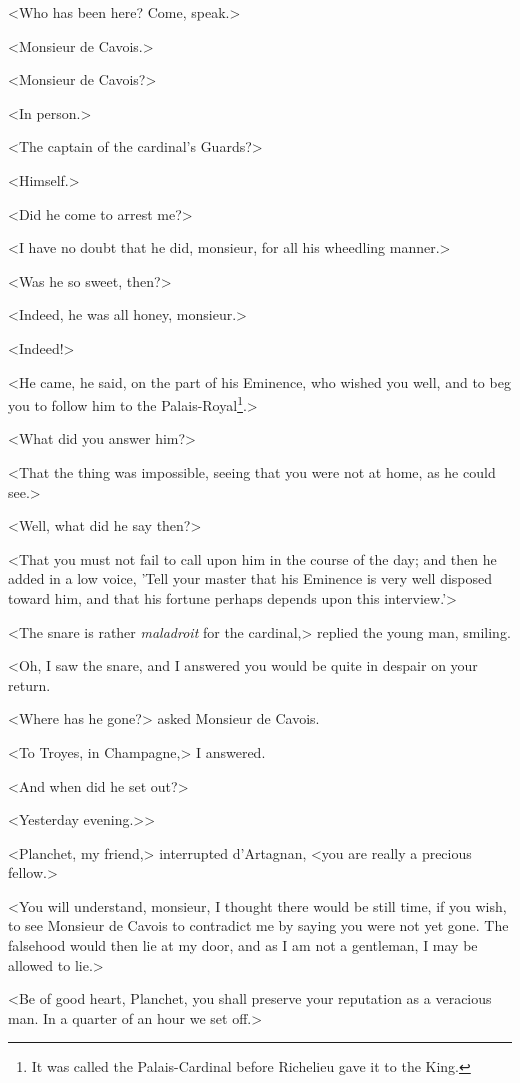 <Who has been here? Come, speak.> 

<Monsieur de Cavois.> 

<Monsieur de Cavois?> 

<In person.> 

<The captain of the cardinal's Guards?> 

<Himself.> 

<Did he come to arrest me?> 

<I have no doubt that he did, monsieur, for all his wheedling manner.> 

<Was he so sweet, then?> 

<Indeed, he was all honey, monsieur.> 

<Indeed!> 

<He came, he said, on the part of his Eminence, who wished you well, and to beg you to follow him to the Palais-Royal\footnote{It was called the Palais-Cardinal before Richelieu gave it to the King.}.> 

<What did you answer him?> 

<That the thing was impossible, seeing that you were not at home, as he could see.> 

<Well, what did he say then?> 

<That you must not fail to call upon him in the course of the day; and then he added in a low voice, 'Tell your master that his Eminence is very well disposed toward him, and that his fortune perhaps depends upon this interview.'> 

<The snare is rather \textit{maladroit} for the cardinal,> replied the young man, smiling. 

<Oh, I saw the snare, and I answered you would be quite in despair on your return. 

<Where has he gone?> asked Monsieur de Cavois. 

<To Troyes, in Champagne,> I answered. 

<And when did he set out?>

<Yesterday evening.>>

<Planchet, my friend,> interrupted d'Artagnan, <you are really a precious fellow.> 

<You will understand, monsieur, I thought there would be still time, if you wish, to see Monsieur de Cavois to contradict me by saying you were not yet gone. The falsehood would then lie at my door, and as I am not a gentleman, I may be allowed to lie.> 

<Be of good heart, Planchet, you shall preserve your reputation as a veracious man. In a quarter of an hour we set off.> 


